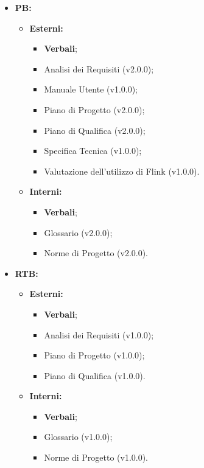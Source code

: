 \documentclass[8pt]{article}
\begin{document}
 \begin{itemize}
    \item \textbf{PB:}
    \begin{itemize}
        \item \textbf{Esterni:}
        \begin{itemize}
            \item \textbf{Verbali};
            \item Analisi dei Requisiti (v2.0.0);
            \item Manuale Utente (v1.0.0);
            \item Piano di Progetto (v2.0.0);
            \item Piano di Qualifica (v2.0.0);
            \item Specifica Tecnica (v1.0.0);
            \item Valutazione dell'utilizzo di Flink (v1.0.0).
        \end{itemize}
        \item \textbf{Interni:}
        \begin{itemize}
            \item \textbf{Verbali};
            \item Glossario (v2.0.0);
            \item Norme di Progetto (v2.0.0).
        \end{itemize}
    \end{itemize}
    \item \textbf{RTB:}
    \begin{itemize}
        \item \textbf{Esterni:}
        \begin{itemize}
            \item \textbf{Verbali};
            \item Analisi dei Requisiti (v1.0.0);
            \item Piano di Progetto (v1.0.0);
            \item Piano di Qualifica (v1.0.0).
        \end{itemize}
        \item \textbf{Interni:}
        \begin{itemize}
            \item \textbf{Verbali};
            \item Glossario (v1.0.0);
            \item Norme di Progetto (v1.0.0).
        \end{itemize}
    \end{itemize}

\end{itemize}
\end{document}
